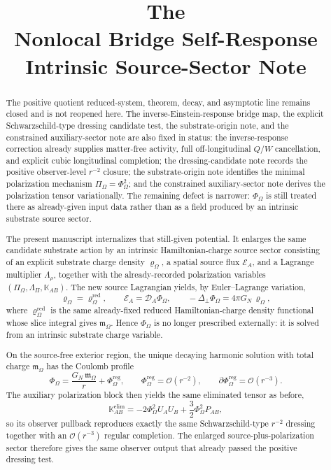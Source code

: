 \documentclass[11pt]{article}
\title{\textbf{The \TheoryName{}}\\[0.4em]
\large Nonlocal Bridge Self-Response Intrinsic Source-Sector Note}
\author{}
\date{}
\newcommand{\ProjSub}{P}
\newcommand{\SpatialD}{\mathcal D}
\newcommand{\LapPerp}{\Delta_\perp}
\newcommand{\FlowPot}{\Phi_\Omega}
\newcommand{\FlowPotReg}{\Phi_\Omega^{\mathrm{reg}}}
\newcommand{\BalanceField}{\Pi_\Omega}
\newcommand{\BalMult}{\Lambda_\Pi}
\newcommand{\SourceDensity}{\varrho_\Omega}
\newcommand{\SourceDensityRed}{\varrho_\Omega^{\mathrm{red}}}
\newcommand{\SourceMult}{\Lambda_\rho}
\newcommand{\SourceFlux}{\mathcal E}
\newcommand{\HamChargeOmega}{\mathfrak m_\Omega}
\newcommand{\AuxPol}{\mathbb K}
\begin{document}
\maketitle

\begin{abstract}
The positive quotient reduced-system, theorem, decay, and asymptotic line remains closed and is not reopened here. The inverse-Einstein-response bridge map, the explicit Schwarzschild-type dressing candidate test, the substrate-origin note, and the constrained auxiliary-sector note are also fixed in status: the inverse-response correction already supplies matter-free activity, full off-longitudinal \(Q/W\) cancellation, and explicit cubic longitudinal completion; the dressing-candidate note records the positive observer-level \(r^{-2}\) closure; the substrate-origin note identifies the minimal polarization mechanism \(\BalanceField=\FlowPot^2\); and the constrained auxiliary-sector note derives the polarization tensor variationally. The remaining defect is narrower: \(\FlowPot\) is still treated there as already-given input data rather than as a field produced by an intrinsic substrate source sector.

The present manuscript internalizes that still-given potential. It enlarges the same candidate substrate action by an intrinsic Hamiltonian-charge source sector consisting of an explicit substrate charge density \(\SourceDensity\), a spatial source flux \(\SourceFlux_A\), and a Lagrange multiplier \(\SourceMult\), together with the already-recorded polarization variables \((\BalanceField,\BalMult,\AuxPol_{AB})\). The new source Lagrangian yields, by Euler--Lagrange variation,
\[
\SourceDensity=\SourceDensityRed,
\qquad
\SourceFlux_A=\SpatialD_A\FlowPot,
\qquad
-\LapPerp \FlowPot=4\pi G_N\,\SourceDensity,
\]
where \(\SourceDensityRed\) is the same already-fixed reduced Hamiltonian-charge density functional whose slice integral gives \(\HamChargeOmega\). Hence \(\FlowPot\) is no longer prescribed externally: it is solved from an intrinsic substrate charge variable.

On the source-free exterior region, the unique decaying harmonic solution with total charge \(\HamChargeOmega\) has the Coulomb profile
\[
\FlowPot
=
\frac{G_N\,\HamChargeOmega}{r}
+\FlowPotReg,
\qquad
\FlowPotReg=\mathcal O(r^{-2}),
\qquad
\partial \FlowPotReg=\mathcal O(r^{-3}).
\]
The auxiliary polarization block then yields the same eliminated tensor as before,
\[
\AuxPol_{AB}^{\mathrm{elim}}
=
-2\FlowPot^2U_AU_B
+\frac32\FlowPot^2\ProjSub_{AB},
\]
so its observer pullback reproduces exactly the same Schwarzschild-type \(r^{-2}\) dressing together with an \(\mathcal O(r^{-3})\) regular completion. The enlarged source-plus-polarization sector therefore gives the same observer output that already passed the positive dressing test.


\end{abstract}
\end{document}

